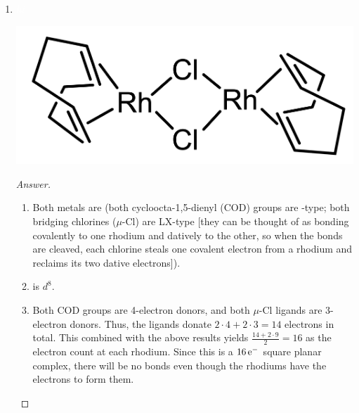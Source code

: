 \documentclass[../psets.tex]{subfiles}
\begin{document}
\begin{enumerate}
\begin{enumerate}[label={\arabic*)}]
\begin{center}
        \end{center}
        \begin{proof}[Answer]\leavevmode
            \begin{enumerate}[label={(\roman*)}]
                \item {} (both pentamethylcyclopentadienyl () groups are -type; both hydrides are X-type).
                \item {} is $d^0$.
                \item Both  groups are 5-electron donors, and both hydrogens are 1-electron donors. Thus, the ligands donate $2\cdot 5+2\cdot 1=12$ electrons in total. This combined with the above results yields $12+4=16$ as the electron count.
            \end{enumerate}
        \end{proof}
        \item ${\color{white}hi}$
        \begin{center}
            \includegraphics[width=0.3\linewidth]{../ExtFiles/pset1-1-06.png}
        \end{center}
        \begin{proof}[Answer]\leavevmode
            \begin{enumerate}[label={(\roman*)}]
                \item Both metals are  (both cycloocta-1,5-dienyl (COD) groups are -type; both bridging chlorines ($\mu$-Cl) are LX-type [they can be thought of as bonding covalently to one rhodium and datively to the other, so when the bonds are cleaved, each chlorine steals one covalent electron from a rhodium and reclaims its two dative electrons]).
                \item {} is $d^8$.
                \item Both COD groups are 4-electron donors, and both $\mu$-Cl ligands are 3-electron donors. Thus, the ligands donate $2\cdot 4+2\cdot 3=14$ electrons in total. This combined with the above results yields $\frac{14+2\cdot 9}{2}=16$ as the electron count at each rhodium. Since this is a $16\,\e[-]$ square planar complex, there will be no  bonds even though the rhodiums have the electrons to form them.
            \end{enumerate}

\end{proof}
\end{enumerate}
\end{enumerate}
\end{document}
